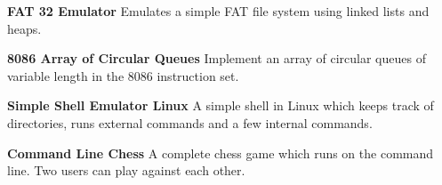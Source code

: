 \documentclass[10pt,a4paper]{altacv}
\begin{document}
\textbf{\large{FAT 32 Emulator}}
\newline
Emulates a simple FAT file system using linked lists and heaps.
\newline

\textbf{\large{8086 Array of Circular Queues}}\newline
Implement an array of circular queues of variable length in the 8086 instruction set.
\newline

\textbf{\large{Simple Shell Emulator Linux}} \newline
A simple shell in Linux which keeps track of directories, runs external commands and a few internal commands.
\newline

\textbf{\large{Command Line Chess}} \newline
A complete chess game which runs on the command line. Two users can play against each other.
\newline
\end{document}
